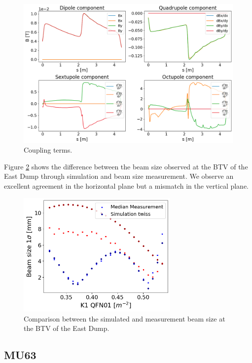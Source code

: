 \begin{figure}[H]
\centering
\includegraphics[width=1.0\textwidth]{02_Simulation/images/coupling_terms.png}
\caption{Coupling terms.}
\label{fig:coupling_terms}
\end{figure}

Figure \ref{fig:comparison_sim_meas} shows the difference between the beam size observed at the BTV of the East Dump through simulation and beam size measurement. We observe an excellent agreement in the horizontal plane but a mismatch in the vertical plane.

\begin{figure}[H]
\centering
\includegraphics[width=0.7\textwidth]{02_Simulation/images/comparison_sim_meas.png}
\caption{Comparison between the simulated and measurement beam size at the BTV of the East Dump.}
\label{fig:comparison_sim_meas}
\end{figure}

\subsection{MU63}

